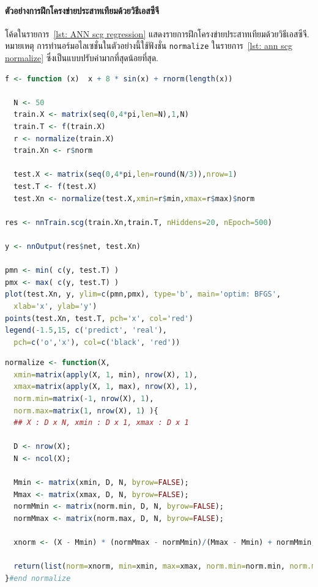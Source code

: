 \paragraph{ตัวอย่างการฝึกโครงข่ายประสาทเทียมด้วยวิธีเอสซีจี}

โค้ดในรายการ~\ref{lst: ANN scg regression} แสดงรายการฝึกโครงข่ายประสาทเทียมด้วยวิธีเอสซีจี.
หมายเหตุ การทำนอร์มอไลเซชั่นในตัวอย่างนี้ใช้ฟังชั่น \texttt{normalize} ในรายการ~\ref{lst: ann scg normalize} ซึ่งเป็นแบบปรับค่ามากที่สุดน้อยที่สุด.

\begin{lstlisting}[language=R,caption={โค้ดทดสอบการฝึกโครงข่ายประสาทเทียมด้วยวิธี SCG},
label={lst: ANN scg regression}] 
  f <- function (x)  x + 8 * sin(x) + rnorm(length(x))

  N <- 50
  train.X <- matrix(seq(0,4*pi,len=N),1,N)
  train.T <- f(train.X)
  r <- normalize(train.X)
  train.Xn <- r$norm

  test.X <- matrix(seq(0,4*pi,len=round(N/3)),nrow=1)
  test.T <- f(test.X)
  test.Xn <- normalize(test.X,xmin=r$min,xmax=r$max)$norm

res <- nnTrain.scg(train.Xn,train.T, nHiddens=20, nEpoch=500)

y <- nnOutput(res$net, test.Xn)
  
pmn <- min( c(y, test.T) )
pmx <- max( c(y, test.T) )
plot(test.Xn, y, ylim=c(pmn,pmx), type='b', main='optim: BFGS',
  xlab='x', ylab='y')
points(test.Xn, test.T, pch='x', col='red')
legend(-1.5,15, c('predict', 'real'), 
  pch=c('o','x'), col=c('black', 'red'))
\end{lstlisting}

\begin{lstlisting}[language=R,caption={โค้ดการทำนอร์มอไลเซชั่นแบบปรับค่ามากที่สุดน้อยที่สุด (ดูหัวข้อ~\ref{section: normalization})},
label={lst: ann scg normalize}]
normalize <- function(X, 
  xmin=matrix(apply(X, 1, min), nrow(X), 1),
  xmax=matrix(apply(X, 1, max), nrow(X), 1),
  norm.min=matrix(-1, nrow(X), 1),
  norm.max=matrix(1, nrow(X), 1) ){
  ## X : D x N, xmin : D x 1, xmax : D x 1
  
  D <- nrow(X);
  N <- ncol(X);
  
  Mmin <- matrix(xmin, D, N, byrow=FALSE);
  Mmax <- matrix(xmax, D, N, byrow=FALSE);
  normMmin <- matrix(norm.min, D, N, byrow=FALSE);
  normMmax <- matrix(norm.max, D, N, byrow=FALSE);

  xnorm <- (X - Mmin) * (normMmax - normMmin)/(Mmax - Mmin) + normMmin;
  
  return(list(norm=xnorm, min=xmin, max=xmax, norm.min=norm.min, norm.max=norm.max))
}#end normalize
\end{lstlisting}

